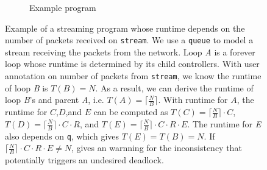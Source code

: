 \begin{figure}
\centering
\begin{subfigure}[b]{0.8\textwidth}
\inputminted{python}{code/runtime.py}
\caption{Example program}
\end{subfigure}
\caption[Runtime analysis]{
  Example of a streaming program whose runtime depends on the number of packets received on
  \texttt{stream}. We use a \texttt{queue} to model a stream receiving the packets from the
  network.
  Loop \emph{A} is a forever loop whose runtime is determined by its child controllers.
  With user annotation on number of packets from \texttt{stream}, 
  we know the runtime of loop \emph{B} is $T(B) = N$.
  As a result, we can derive the runtime of loop \emph{B}'s and parent \emph{A}, 
  i.e. $T(A) = \lceil\frac{N}{B}\rceil$. 
  With runtime for $A$, the runtime for $C$,$D$,and $E$ can be computed as
  $T(C) = \lceil\frac{N}{B}\rceil\cdot C$,
  $T(D) = \lceil\frac{N}{B}\rceil\cdot C \cdot R$, 
  and $T(E) = \lceil\frac{N}{B}\rceil\cdot C \cdot R \cdot E$.
  The runtime for \emph{E} also depends on \texttt{q}, which gives $T(E) = T(B) = N$. 
  If $\lceil\frac{N}{B}\rceil\cdot C \cdot R \cdot E \neq N$, \name gives an warnning for the
  inconsistency that potentially triggers an undesired deadlock.
}
\label{fig:runtime}
\end{figure}
